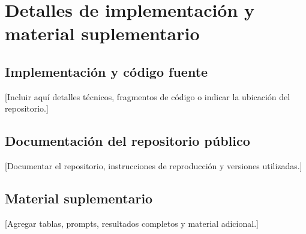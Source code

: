 \chapter{Detalles de implementación y material suplementario}
\label{appendix:material}

\section{Implementación y código fuente}
[Incluir aquí detalles técnicos, fragmentos de código o indicar la ubicación del repositorio.]

\section{Documentación del repositorio público}
[Documentar el repositorio, instrucciones de reproducción y versiones utilizadas.]

\section{Material suplementario}
[Agregar tablas, prompts, resultados completos y material adicional.]
